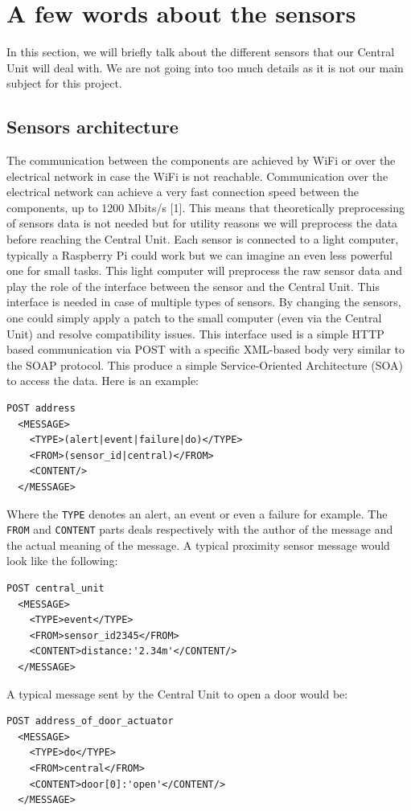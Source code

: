 \documentclass{acm_proc_article-sp}
\begin{document}
\section{A few words about the sensors}
In this section, we will briefly talk about the different sensors that our Central Unit will deal with. 
We are not going into too much details as it is not our main subject for this project.
\subsection{Sensors architecture}
The communication between the components are achieved by WiFi or over the electrical network in case the WiFi is not reachable. 
Communication over the electrical network can achieve a very fast connection speed between the components, up to 1200 Mbits/s [1]. %
This means that theoretically preprocessing of sensors data is not needed but for utility reasons we will preprocess the data before reaching the Central Unit.
Each sensor is connected to a light computer, typically a Raspberry Pi could work but we can imagine an even less powerful one for small tasks. 
This light computer will preprocess the raw sensor data and play the role of the interface between the sensor and the Central Unit. 
This interface is needed in case of multiple types of sensors. By changing the sensors, one could simply apply a patch to the small computer (even via the Central Unit) and resolve compatibility issues. 
This interface used is a simple HTTP based communication via POST with a specific XML-based body very similar to the SOAP protocol. 
This produce a simple Service-Oriented Architecture (SOA) to access the data. 
Here is an example:
\begin{verbatim}
POST address 
  <MESSAGE>
    <TYPE>(alert|event|failure|do)</TYPE>
    <FROM>(sensor_id|central)</FROM>
    <CONTENT/>
  </MESSAGE>
\end{verbatim}
Where the \texttt{TYPE} denotes an alert, an event or even a failure for example. 
The \texttt{FROM} and \texttt{CONTENT} parts deals respectively with the author of the message and the actual meaning of the message. 
A typical proximity sensor message would look like the following:
\begin{verbatim}
POST central_unit 
  <MESSAGE>
    <TYPE>event</TYPE>
    <FROM>sensor_id2345</FROM>
    <CONTENT>distance:'2.34m'</CONTENT/>
  </MESSAGE>
\end{verbatim}
A typical message sent by the Central Unit to open a door would be:
\begin{verbatim}
POST address_of_door_actuator
  <MESSAGE>
    <TYPE>do</TYPE>
    <FROM>central</FROM>
    <CONTENT>door[0]:'open'</CONTENT/>
  </MESSAGE> 
\end{verbatim}
\end{document}
